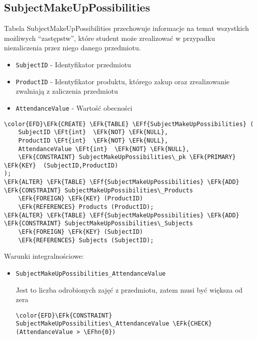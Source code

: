 \documentclass[11pt]{article}
\newcommand{\EFk}[1]{\textcolor{EFk}{\textbf{#1}}} %
\newcommand{\EFf}[1]{\textcolor{EFf}{#1}} %
\newcommand{\EFt}[1]{\textcolor{EFt}{\textbf{#1}}} %
\newcommand{\EFhn}[1]{\textcolor{EFhn}{#1}} %
\begin{document}
\subsection{SubjectMakeUpPossibilities}
\label{sec:org2ec53c9}
Tabela SubjectMakeUpPossibilities przechowuje informacje na temat wszystkich możliwych ``zastępstw'', które student może zrealizować w przypadku niezaliczenia przez niego danego przedmiotu.
\begin{itemize}
\item \texttt{SubjectID} - Identyfikator przedmiotu
\item \texttt{ProductID} - Identyfikator produktu, którego zakup oraz zrealizowanie zwalniają z zaliczenia przedmiotu
\item \texttt{AttendanceValue} - Wartość obecności
\end{itemize}
\begin{Code}
\begin{Verbatim}
\color{EFD}\EFk{CREATE} \EFk{TABLE} \EFf{SubjectMakeUpPossibilities} (
    SubjectID \EFt{int}  \EFk{NOT} \EFk{NULL},
    ProductID \EFt{int}  \EFk{NOT} \EFk{NULL},
    AttendanceValue \EFt{int}  \EFk{NOT} \EFk{NULL},
    \EFk{CONSTRAINT} SubjectMakeUpPossibilities\_pk \EFk{PRIMARY} \EFk{KEY}  (SubjectID,ProductID)
);
\EFk{ALTER} \EFk{TABLE} \EFf{SubjectMakeUpPossibilities} \EFk{ADD} \EFk{CONSTRAINT} SubjectMakeUpPossibilities\_Products
    \EFk{FOREIGN} \EFk{KEY} (ProductID)
    \EFk{REFERENCES} Products (ProductID);
\EFk{ALTER} \EFk{TABLE} \EFf{SubjectMakeUpPossibilities} \EFk{ADD} \EFk{CONSTRAINT} SubjectMakeUpPossibilities\_Subjects
    \EFk{FOREIGN} \EFk{KEY} (SubjectID)
    \EFk{REFERENCES} Subjects (SubjectID);
\end{Verbatim}
\end{Code}
Warunki integralnościowe:


\begin{itemize}
\item \texttt{SubjectMakeUpPossibilities\_AttendanceValue}

Jest to liczba odrobionych zajęć z przedmiotu, zatem musi być większa od zera
\begin{Code}
\begin{Verbatim}
\color{EFD}\EFk{CONSTRAINT} SubjectMakeUpPossibilities\_AttendanceValue \EFk{CHECK}
(AttendanceValue > \EFhn{0})
\end{Verbatim}
\end{Code}
\end{itemize}
\end{document}
